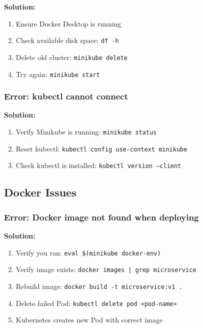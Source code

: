 \documentclass[12pt,a4paper]{article}
\begin{document}
\begin{warningbox}
\textbf{Solution:}
\begin{enumerate}
    \item Ensure Docker Desktop is running
    \item Check available disk space: \texttt{df -h}
    \item Delete old cluster: \texttt{minikube delete}
    \item Try again: \texttt{minikube start}
\end{enumerate}
\end{warningbox}

\subsubsection{Error: kubectl cannot connect}

\begin{warningbox}
\textbf{Solution:}
\begin{enumerate}
    \item Verify Minikube is running: \texttt{minikube status}
    \item Reset kubectl: \texttt{kubectl config use-context minikube}
    \item Check kubectl is installed: \texttt{kubectl version --client}
\end{enumerate}
\end{warningbox}

\subsection{Docker Issues}

\subsubsection{Error: Docker image not found when deploying}

\begin{warningbox}
\textbf{Solution:}
\begin{enumerate}
    \item Verify you ran: \texttt{eval \$(minikube docker-env)}
    \item Verify image exists: \texttt{docker images | grep microservice}
    \item Rebuild image: \texttt{docker build -t microservice:v1 .}
    \item Delete failed Pod: \texttt{kubectl delete pod <pod-name>}
    \item Kubernetes creates new Pod with correct image
\end{enumerate}
\end{warningbox}
\end{document}
